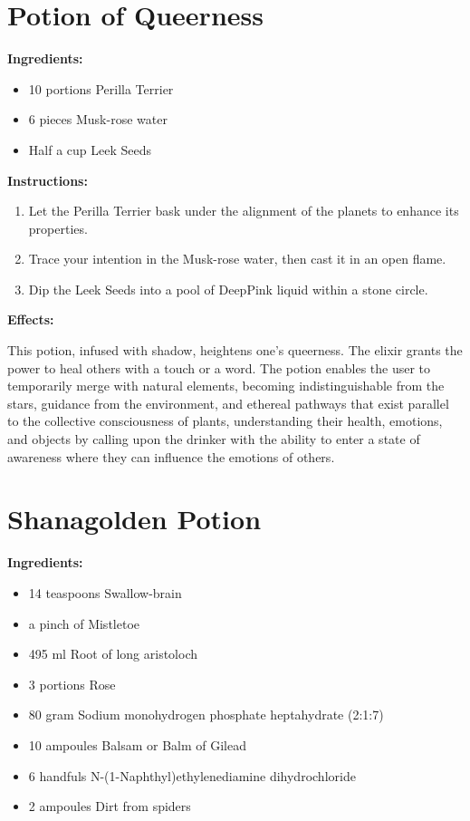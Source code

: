 \documentclass{article}
\begin{document}
\newpage
\section*{Potion of Queerness}

\textbf{Ingredients:}

\begin{itemize}
  \item 10 portions Perilla Terrier
  \item 6 pieces Musk-rose water
  \item Half a cup Leek Seeds
\end{itemize}

\textbf{Instructions:}

\begin{enumerate}
  \item Let the Perilla Terrier bask under the alignment of the planets to enhance its properties.
  \item Trace your intention in the Musk-rose water, then cast it in an open flame.
  \item Dip the Leek Seeds into a pool of DeepPink liquid within a stone circle.
\end{enumerate}

\textbf{Effects:}

This potion, infused with shadow, heightens one's queerness. The elixir grants the power to heal others with a touch or a word. The potion enables the user to temporarily merge with natural elements, becoming indistinguishable from the stars, guidance from the environment, and ethereal pathways that exist parallel to the collective consciousness of plants, understanding their health, emotions, and objects by calling upon the drinker with the ability to enter a state of awareness where they can influence the emotions of others.

\newpage
\section*{Shanagolden Potion}

\textbf{Ingredients:}

\begin{itemize}
  \item 14 teaspoons Swallow-brain
  \item a pinch of Mistletoe
  \item 495 ml Root of  long aristoloch
  \item 3 portions Rose
  \item 80 gram Sodium monohydrogen phosphate heptahydrate (2:1:7)
  \item 10 ampoules Balsam or Balm of Gilead
  \item 6 handfuls N-(1-Naphthyl)ethylenediamine dihydrochloride
  \item 2 ampoules Dirt from spiders
\end{itemize}
\end{document}
